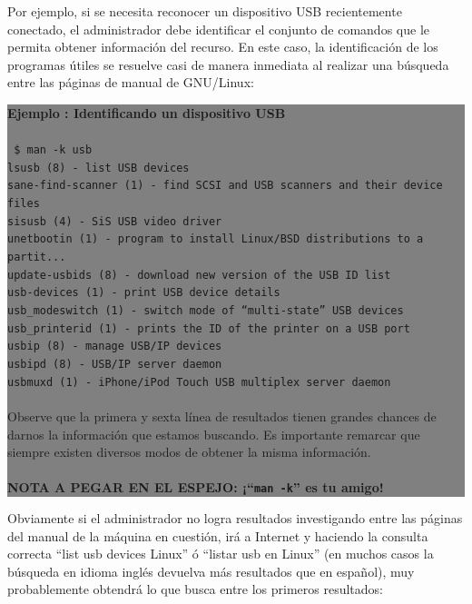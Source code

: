 \documentclass[12pt]{article}
\begin{document}
Por ejemplo, si se necesita reconocer un dispositivo USB recientemente conectado, 
el administrador debe identificar el conjunto de comandos que le permita obtener información del recurso.
En este caso, la identificación de los programas útiles se resuelve casi 
de manera inmediata al realizar una búsqueda entre las páginas de manual de GNU/Linux: 

\colorbox{grey}{\parbox[t]{0.95\linewidth}{ \vspace*{0.5cm} { 
{\bf Ejemplo : Identificando un dispositivo USB} \\ \\
{\tt 
\$ man -k usb \\
lsusb (8)            - list USB devices\\
sane-find-scanner (1) - find SCSI and USB scanners and their device files\\
sisusb (4)           - SiS USB video driver\\
unetbootin (1)       - program to install Linux/BSD distributions to a partit...\\
update-usbids (8)    - download new version of the USB ID list\\
usb-devices (1)      - print USB device details\\
usb\_modeswitch (1)   - switch mode of ``multi-state'' USB devices\\
usb\_printerid (1)    - prints the ID of the printer on a USB port\\
usbip (8)            - manage USB/IP devices\\
usbipd (8)           - USB/IP server daemon\\
usbmuxd (1)          - iPhone/iPod Touch USB multiplex server daemon\\ \\
}
Observe que la primera y sexta línea de resultados tienen grandes chances 
de darnos la información que estamos buscando. Es importante remarcar que
siempre existen diversos modos de obtener la misma información. \\ 
\\
{\bf NOTA A PEGAR EN EL ESPEJO: ¡``{\tt man -k}'' es tu amigo! }
} \vspace*{0.5cm} } } 

Obviamente si el administrador no logra resultados investigando entre las 
páginas del manual de la máquina en cuestión, irá a Internet y haciendo la consulta
correcta ``list usb devices Linux'' ó ``listar usb en Linux'' (en 
muchos casos la búsqueda en idioma inglés devuelva más resultados que en español),  
muy probablemente obtendrá lo que busca entre los primeros resultados: 
\end{document}
